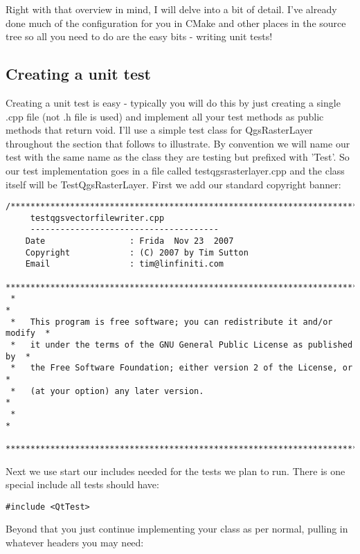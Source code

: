 Right with that overview in mind, I will delve into a bit of detail. I've already 
done much of the configuration for you in CMake and other places in the source tree 
so all you need to do are the easy bits - writing unit tests!

\subsection{Creating a unit test}
Creating a unit test is easy - typically you will do this by just creating a 
single .cpp file (not .h file is used) and implement all your test methods as
public methods that return void. I'll use a simple test class for QgsRasterLayer 
throughout the section that follows to illustrate. By convention we will name our 
test with the same name as the class they are testing but prefixed with 'Test'.
So our test implementation goes in a file called testqgsrasterlayer.cpp and 
the class itself will be TestQgsRasterLayer. First we add our standard copyright 
banner:

\newpage

\begin{verbatim}
/***************************************************************************
     testqgsvectorfilewriter.cpp
     --------------------------------------
    Date                 : Frida  Nov 23  2007
    Copyright            : (C) 2007 by Tim Sutton
    Email                : tim@linfiniti.com
 ***************************************************************************
 *                                                                         *
 *   This program is free software; you can redistribute it and/or modify  *
 *   it under the terms of the GNU General Public License as published by  *
 *   the Free Software Foundation; either version 2 of the License, or     *
 *   (at your option) any later version.                                   *
 *                                                                         *
 ***************************************************************************/
\end{verbatim}

Next we use start our includes needed for the tests we plan to run. There is 
one special include all tests should have:

\begin{verbatim}
#include <QtTest>
\end{verbatim}

Beyond that you just continue implementing your class as per normal, pulling 
in whatever headers you may need:

